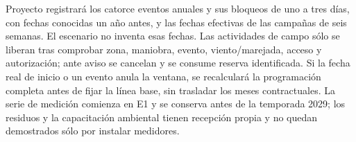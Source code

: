 Proyecto registrará los catorce eventos anuales y sus bloqueos de uno a tres días, con fechas conocidas un año antes, y las fechas efectivas de las campañas de seis semanas. El escenario no inventa esas fechas. Las actividades de campo sólo se liberan tras comprobar zona, maniobra, evento, viento/marejada, acceso y autorización; ante aviso se cancelan y se consume reserva identificada. Si la fecha real de inicio o un evento anula la ventana, se recalculará la programación completa antes de fijar la línea base, sin trasladar los meses contractuales. La serie de medición comienza en E1 y se conserva antes de la temporada 2029; los residuos y la capacitación ambiental tienen recepción propia y no quedan demostrados sólo por instalar medidores.
